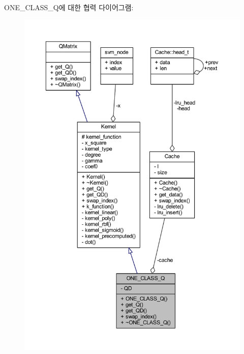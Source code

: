 O\+N\+E\+\_\+\+C\+L\+A\+S\+S\+\_\+\+Q에 대한 협력 다이어그램\+:
\nopagebreak
\begin{figure}[H]
\begin{center}
\leavevmode
\includegraphics[width=350pt]{class_o_n_e___c_l_a_s_s___q__coll__graph}
\end{center}
\end{figure}
